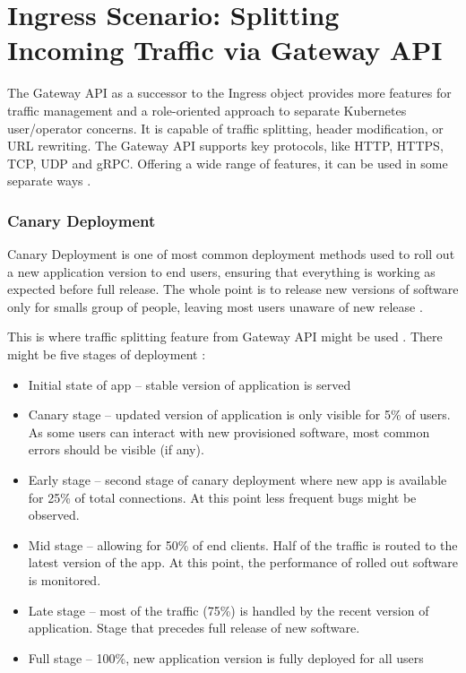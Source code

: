 \section{Ingress Scenario: Splitting Incoming Traffic via Gateway API}
\label{sec:ingress}

The Gateway API as a successor to the Ingress object provides more features for traffic management and a role-oriented approach to separate Kubernetes user/operator concerns. It is capable of traffic splitting, header modification, or URL rewriting. The Gateway API supports key protocols, like HTTP, HTTPS, TCP, UDP and gRPC. Offering a wide range of features, it can be used in some separate ways \cite{CiliumGatewayAPIBlog}.

\subsubsection{Canary Deployment}
\label{subsubsection:canary}

Canary Deployment is one of most common deployment methods used to roll out a new application version to end users, ensuring that everything is working as expected before full release. The whole point is to release new versions of software only for smalls group of people, leaving most users unaware of new release \cite{Canary}.

This is where traffic splitting feature from Gateway API might be used \cite{CiliumTrafficSplitting}. There might be five stages of deployment \cite{Canary}:

\begin{itemize}
    \item Initial state of app -- stable version of application is served
    \item Canary stage -- updated version of application is only visible for 5\% of users. As some users can interact with new provisioned software, most common errors should be visible (if any).
    \item Early stage -- second stage of canary deployment where new app is available for 25\% of total connections. At this point less frequent bugs might be observed.
    \item Mid stage -- allowing for 50\% of end clients. Half of the traffic is routed to the latest version of the app. At this point, the performance of rolled out software is monitored.
    \item Late stage -- most of the traffic (75\%) is handled by the recent version of application. Stage that precedes full release of new software.
    \item Full stage -- 100\%, new application version is fully deployed for all users
\end{itemize}


